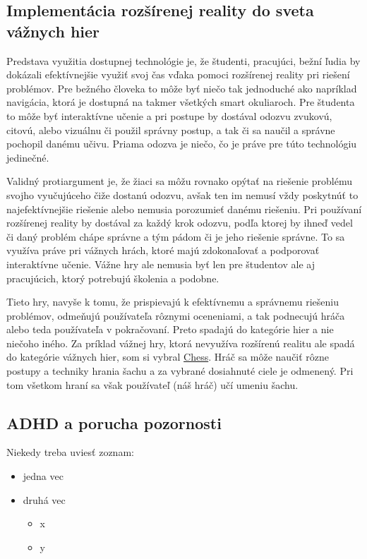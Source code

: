 \documentclass[10pt,twoside,a4paper]{article}
\begin{document}
\subsection{Implementácia rozšírenej reality do sveta vážnych hier}
\par Predstava využitia dostupnej technológie je, že študenti, pracujúci, bežní ľudia by dokázali efektívnejšie využiť svoj čas vďaka pomoci rozšírenej reality pri riešení problémov. Pre bežného človeka to môže byť niečo tak jednoduché ako napríklad navigácia, ktorá je dostupná na takmer všetkých smart okuliaroch. Pre študenta to môže byť interaktívne učenie a pri postupe by dostával odozvu zvukovú, citovú, alebo vizuálnu či použil správny postup, a tak či sa naučil a správne pochopil danému učivu. Priama odozva je niečo, čo je práve pre túto technológiu jedinečné. \par Validný protiargument je, že žiaci sa môžu rovnako opýtať na riešenie problému svojho vyučujúceho čiže dostanú odozvu, avšak ten im nemusí vždy poskytnúť to najefektívnejšie riešenie alebo nemusia porozumieť danému riešeniu. Pri používaní rozšírenej reality by dostával za každý krok odozvu, podľa ktorej by ihneď vedel či daný problém chápe správne a tým pádom či je jeho riešenie správne. To sa využíva práve pri vážnych hrách, ktoré majú zdokonaľovať a podporovať interaktívne učenie. Vážne hry ale nemusia byť len pre študentov ale aj pracujúcich, ktorý potrebujú školenia a podobne. \par Tieto hry, navyše k tomu, že prispievajú k efektívnemu a správnemu riešeniu problémov, odmeňujú používateľa rôznymi oceneniami, a tak podnecujú hráča alebo teda používateľa v pokračovaní. Preto spadajú do kategórie hier a nie niečoho iného. Za príklad vážnej hry, ktorá nevyužíva rozšírenú realitu ale spadá do kategórie vážnych hier, som si vybral \href{https://www.chess.com/}{Chess}. Hráč sa môže naučiť rôzne postupy a techniky hrania šachu a za vybrané dosiahnuté ciele je odmenený. Pri tom všetkom hraní sa však používateľ (náš hráč) učí umeniu šachu.


\subsection{ADHD a porucha pozornosti}

Niekedy treba uviesť zoznam:

\begin{itemize}
\item jedna vec
\item druhá vec
	\begin{itemize}
	\item x
	\item y
	\end{itemize}
\end{itemize}
\end{document}
